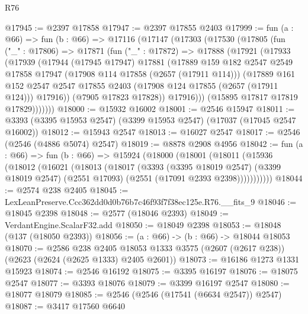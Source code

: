 \begin{lexlean}{R76}
\begin{coremodule}
@17945 := @2397 @17858
@17947 := @2397 @17855 @2403
@17999 := fun (a : @66) =>
  fun (b : @66) =>
  @17116
    (@17147
      (@17303
        (@17530
          (@17805
            (fun ("_" : @17806) =>
            @17871
              (fun ("_" : @17872) =>
              @17888
                (@17921
                  (@17933
                    (@17939
                      (@17944
                        (@17945 @17947)
                        @17881
                        (@17889
                          @159
                          @182
                          @2547
                          @2549
                          @17858
                          @17947
                          (@17908 @114 @17858 (@2657 (@17911 @114)))
                          (@17889
                            @161
                            @152
                            @2547
                            @2547
                            @17855
                            @2403
                            (@17908 @124 @17855 (@2657 (@17911 @124)))
                            @17916))
                        (@7905 @17823 @17828))
                      @17916)))
                (@15895 @17817 @17819 @17829)))))))
@18000 := @15932 @16002
@18001 := @2546 @15947
@18011 := @3393 (@3395 @15953 @2547) (@3399 @15953 @2547) (@17037 (@17045 @2547 @16002))
@18012 := @15943 @2547
@18013 := @16027 @2547
@18017 := @2546 (@2546 (@4886 @5074) @2547)
@18019 := @8878 @2908 @4956
@18042 := fun (a : @66) =>
  fun (b : @66) =>
  @15924
    (@18000
      (@18001
        (@18011
          (@15936
            (@18012
              (@16021
                (@18013
                  (@18017
                    (@3393
                      (@3395 @18019 @2547)
                      (@3399 @18019 @2547)
                      (@2551 @17093)
                      (@2551 (@17091 @2393 @2398)))))))))))
@18044 := @2574 @238 @2405
@18045 := LexLeanPreserve.Ccc362dd0d0b76b7c46f93f7f38ec125e.R76.__fits_9
@18046 := @18045 @2398
@18048 := @2577 (@18046 @2393)
@18049 := VerdantEngine.ScalarF32.add
@18050 := @18049 @2398
@18053 := @18048 (@137 (@18050 @2393))
@18056 := (a : @66) -> (b : @66) -> @18044 @18053
@18070 := @2586
    @238
    @2405
    @18053
    @1333
    @3575
    (@2607 (@2617 @238))
    (@2623 (@2624 (@2625 @1333) @2405 @2601))
@18073 := @16186 @1273 @1331 @15923
@18074 := @2546 @16192
@18075 := @3395 @16197
@18076 := @18075 @2547
@18077 := @3393 @18076
@18079 := @3399 @16197 @2547
@18080 := @18077 @18079
@18085 := @2546 (@2546 (@17541 (@6634 @2547)) @2547)
@18087 := @3417 @17560 @6640

\end{coremodule}
\end{lexlean}
